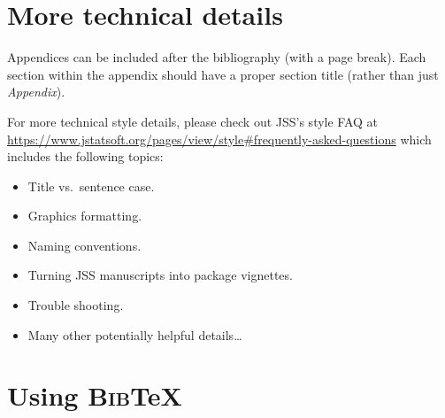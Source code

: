 \documentclass[article]{jss}\usepackage{knitr}
\begin{document}





\newpage

\begin{appendix}

\section{More technical details} \label{app:technical}

\begin{leftbar}
Appendices can be included after the bibliography (with a page break). Each
section within the appendix should have a proper section title (rather than
just \emph{Appendix}).

For more technical style details, please check out JSS's style FAQ at
\url{https://www.jstatsoft.org/pages/view/style#frequently-asked-questions}
which includes the following topics:
\begin{itemize}
  \item Title vs.\ sentence case.
  \item Graphics formatting.
  \item Naming conventions.
  \item Turning JSS manuscripts into  package vignettes.
  \item Trouble shooting.
  \item Many other potentially helpful details\dots
\end{itemize}
\end{leftbar}


\section[Using BibTeX]{Using \textsc{Bib}{\TeX}} \label{app:bibtex}


\end{appendix}
\end{document}
